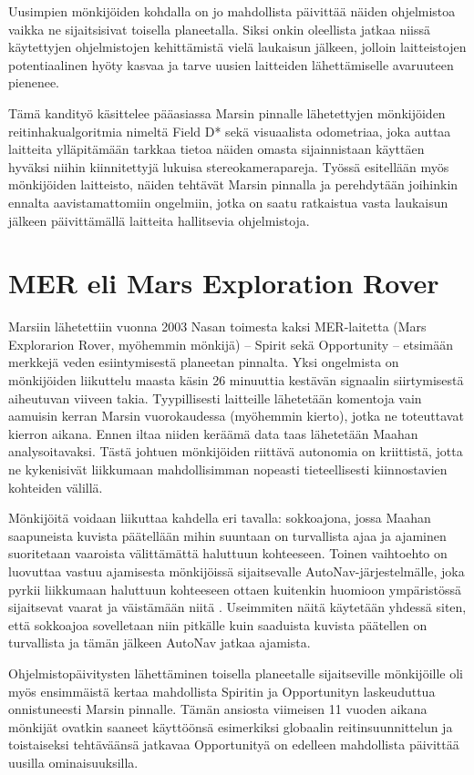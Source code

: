 \documentclass[finnish]{tktltiki2}
\theoremstyle{definition}
\theoremstyle{remark}
\begin{document}
Uusimpien mönkijöiden kohdalla on jo mahdollista päivittää näiden ohjelmistoa vaikka ne sijaitsisivat toisella planeetalla. Siksi onkin oleellista jatkaa niissä käytettyjen ohjelmistojen kehittämistä vielä laukaisun jälkeen, jolloin laitteistojen potentiaalinen hyöty kasvaa ja tarve uusien laitteiden lähettämiselle avaruuteen pienenee.

Tämä kandityö käsittelee pääasiassa Marsin pinnalle lähetettyjen mönkijöiden reitinhakualgoritmia nimeltä Field D* sekä visuaalista odometriaa, joka auttaa laitteita ylläpitämään tarkkaa tietoa näiden omasta sijainnistaan käyttäen hyväksi niihin kiinnitettyjä lukuisa stereokamerapareja. Työssä esitellään myös mönkijöiden laitteisto, näiden tehtävät Marsin pinnalla ja perehdytään joihinkin ennalta aavistamattomiin ongelmiin, jotka on saatu ratkaistua vasta laukaisun jälkeen päivittämällä laitteita hallitsevia ohjelmistoja.

\section{MER eli Mars Exploration Rover}
Marsiin lähetettiin vuonna 2003 Nasan toimesta kaksi MER-laitetta (Mars Explorarion Rover, myöhemmin mönkijä) – Spirit sekä Opportunity – etsimään merkkejä veden esiintymisestä planeetan pinnalta. Yksi ongelmista on mönkijöiden liikuttelu maasta käsin 26 minuuttia kestävän signaalin siirtymisestä aiheutuvan viiveen takia. Tyypillisesti laitteille lähetetään komentoja vain aamuisin kerran Marsin vuorokaudessa (myöhemmin kierto), jotka ne toteuttavat kierron aikana. Ennen iltaa niiden keräämä data taas lähetetään Maahan analysoitavaksi. Tästä johtuen mönkijöiden riittävä autonomia on kriittistä, jotta ne kykenisivät liikkumaan mahdollisimman nopeasti tieteellisesti kiinnostavien kohteiden välillä.

Mönkijöitä voidaan liikuttaa kahdella eri tavalla: sokkoajona, jossa Maahan saapuneista kuvista päätellään mihin suuntaan on turvallista ajaa ja ajaminen suoritetaan vaaroista välittämättä haluttuun kohteeseen. Toinen vaihtoehto on luovuttaa vastuu ajamisesta mönkijöissä sijaitsevalle AutoNav-järjestelmälle, joka pyrkii liikkumaan haluttuun kohteeseen ottaen kuitenkin huomioon ympäristössä sijaitsevat vaarat ja väistämään niitä \cite{marsjuttuja}. Useimmiten näitä käytetään yhdessä siten, että sokkoajoa sovelletaan niin pitkälle kuin saaduista kuvista päätellen on turvallista ja tämän jälkeen AutoNav jatkaa ajamista.

Ohjelmistopäivitysten lähettäminen toisella planeetalle sijaitseville mönkijöille oli myös ensimmäistä kertaa mahdollista Spiritin ja Opportunityn laskeuduttua onnistuneesti Marsin pinnalle. Tämän ansiosta viimeisen 11 vuoden aikana mönkijät ovatkin saaneet käyttöönsä esimerkiksi globaalin reitinsuunnittelun ja toistaiseksi tehtäväänsä jatkavaa Opportunityä on edelleen mahdollista päivittää uusilla ominaisuuksilla.
\end{document}
